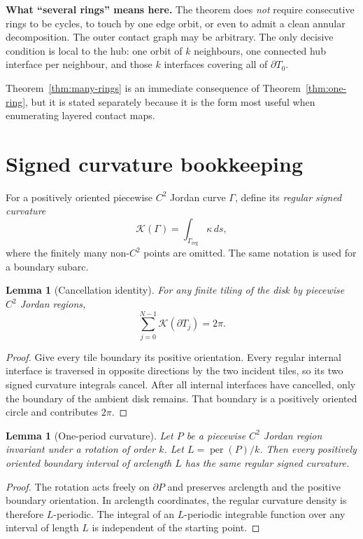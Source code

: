 \documentclass[11pt]{article}
\newtheorem{lemma}[theorem]{Lemma}
\theoremstyle{definition}
\theoremstyle{remark}
\newcommand{\T}{T}
\newcommand{\Kreg}{\mathcal K}
\begin{document}
\begin{plainbox}[boxblue]
\textbf{What ``several rings'' means here.}
The theorem does \emph{not} require consecutive rings to be cycles, to touch by one edge orbit, or even to admit a clean annular decomposition.  The outer contact graph may be arbitrary.  The only decisive condition is local to the hub: one orbit of $k$ neighbours, one connected hub interface per neighbour, and those $k$ interfaces covering all of $\partial\T_0$.
\end{plainbox}

Theorem~\ref{thm:many-rings} is an immediate consequence of Theorem~\ref{thm:one-ring}, but it is stated separately because it is the form most useful when enumerating layered contact maps.

\section{Signed curvature bookkeeping}

For a positively oriented piecewise $C^2$ Jordan curve $\Gamma$, define its \emph{regular signed curvature}
\[
  \Kreg(\Gamma)=\int_{\Gamma_{\mathrm{reg}}}\kappa\,ds,
\]
where the finitely many non-$C^2$ points are omitted.  The same notation is used for a boundary subarc.

\begin{lemma}[Cancellation identity]\label{lem:cancellation}
For any finite tiling of the disk by piecewise $C^2$ Jordan regions,
\[
  \sum_{j=0}^{N-1}\Kreg(\partial\T_j)=2\pi.
\]
\end{lemma}

\begin{proof}
Give every tile boundary its positive orientation.  Every regular internal interface is traversed in opposite directions by the two incident tiles, so its two signed curvature integrals cancel.  After all internal interfaces have cancelled, only the boundary of the ambient disk remains.  That boundary is a positively oriented circle and contributes $2\pi$.
\end{proof}

\begin{lemma}[One-period curvature]\label{lem:period}
Let $P$ be a piecewise $C^2$ Jordan region invariant under a rotation of order $k$.  Let $L=\operatorname{per}(P)/k$.  Then every positively oriented boundary interval of arclength $L$ has the same regular signed curvature.
\end{lemma}

\begin{proof}
The rotation acts freely on $\partial P$ and preserves arclength and the positive boundary orientation.  In arclength coordinates, the regular curvature density is therefore $L$-periodic.  The integral of an $L$-periodic integrable function over any interval of length $L$ is independent of the starting point.
\end{proof}
\end{document}
